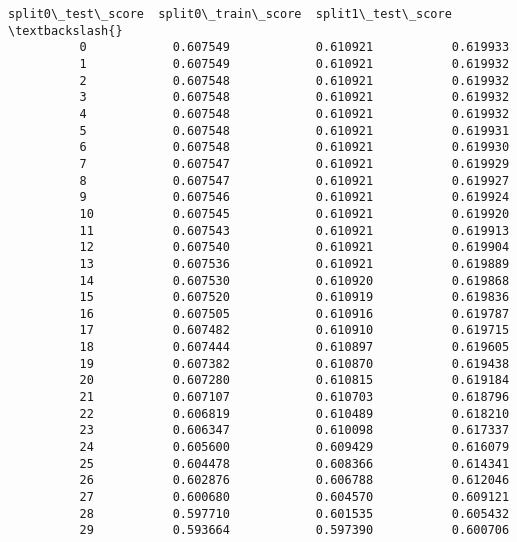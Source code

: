 \documentclass[11pt]{article}
\begin{document}
\begin{Verbatim}[commandchars=\\\{\}]
              split0\_test\_score  split0\_train\_score  split1\_test\_score  \textbackslash{}
          0            0.607549            0.610921           0.619933   
          1            0.607549            0.610921           0.619932   
          2            0.607548            0.610921           0.619932   
          3            0.607548            0.610921           0.619932   
          4            0.607548            0.610921           0.619932   
          5            0.607548            0.610921           0.619931   
          6            0.607548            0.610921           0.619930   
          7            0.607547            0.610921           0.619929   
          8            0.607547            0.610921           0.619927   
          9            0.607546            0.610921           0.619924   
          10           0.607545            0.610921           0.619920   
          11           0.607543            0.610921           0.619913   
          12           0.607540            0.610921           0.619904   
          13           0.607536            0.610921           0.619889   
          14           0.607530            0.610920           0.619868   
          15           0.607520            0.610919           0.619836   
          16           0.607505            0.610916           0.619787   
          17           0.607482            0.610910           0.619715   
          18           0.607444            0.610897           0.619605   
          19           0.607382            0.610870           0.619438   
          20           0.607280            0.610815           0.619184   
          21           0.607107            0.610703           0.618796   
          22           0.606819            0.610489           0.618210   
          23           0.606347            0.610098           0.617337   
          24           0.605600            0.609429           0.616079   
          25           0.604478            0.608366           0.614341   
          26           0.602876            0.606788           0.612046   
          27           0.600680            0.604570           0.609121   
          28           0.597710            0.601535           0.605432   
          29           0.593664            0.597390           0.600706   
          

\end{Verbatim}
\end{document}
